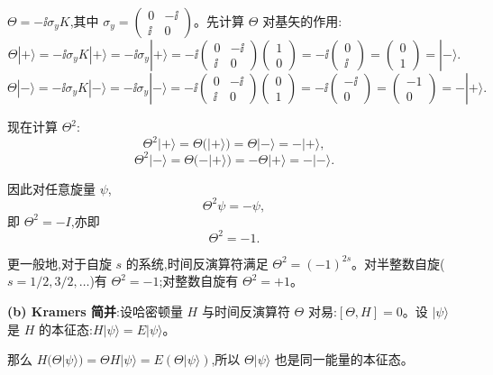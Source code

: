 \begin{solution}
	$\Theta = -\ii\sigma_y K$,其中 $\sigma_y = \begin{pmatrix}0&-\ii\\\ii&0\end{pmatrix}$。先计算 $\Theta$ 对基矢的作用:
	\[
	\Theta|+\rangle = -\ii\sigma_y K|+\rangle = -\ii\sigma_y|+\rangle
	= -\ii\begin{pmatrix}0&-\ii\\\ii&0\end{pmatrix}\begin{pmatrix}1\\0\end{pmatrix}
	= -\ii\begin{pmatrix}0\\\ii\end{pmatrix} = \begin{pmatrix}0\\1\end{pmatrix} = |-\rangle.
	\]
	\[
	\Theta|-\rangle = -\ii\sigma_y K|-\rangle = -\ii\sigma_y|-\rangle
	= -\ii\begin{pmatrix}0&-\ii\\\ii&0\end{pmatrix}\begin{pmatrix}0\\1\end{pmatrix}
	= -\ii\begin{pmatrix}-\ii\\0\end{pmatrix} = \begin{pmatrix}-1\\0\end{pmatrix} = -|+\rangle.
	\]

	现在计算 $\Theta^2$:
	\[
	\Theta^2|+\rangle = \Theta(|+\rangle) = \Theta|-\rangle = -|+\rangle,
	\]
	\[
	\Theta^2|-\rangle = \Theta(-|+\rangle) = -\Theta|+\rangle = -|-\rangle.
	\]

	因此对任意旋量 $\psi$,
	\[
	\Theta^2\psi = -\psi,
	\]
	即 $\Theta^2 = -I$,亦即
	\[
	\boxed{\Theta^2 = -1}.
	\]

	更一般地,对于自旋 $s$ 的系统,时间反演算符满足 $\Theta^2 = (-1)^{2s}$。对半整数自旋($s=1/2,3/2,\ldots$)有 $\Theta^2=-1$;对整数自旋有 $\Theta^2=+1$。

		\textbf{(b) Kramers 简并}:设哈密顿量 $H$ 与时间反演算符 $\Theta$ 对易:$[\Theta,H]=0$。设 $|\psi\rangle$ 是 $H$ 的本征态:$H|\psi\rangle=E|\psi\rangle$。

		那么 $H(\Theta|\psi\rangle) = \Theta H|\psi\rangle = E(\Theta|\psi\rangle)$,所以 $\Theta|\psi\rangle$ 也是同一能量的本征态。


\end{solution}
